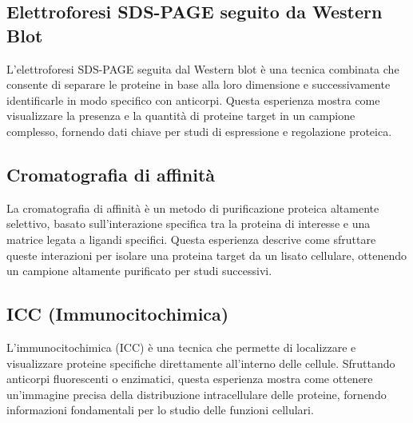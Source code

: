 \subsection{Elettroforesi SDS-PAGE seguito da Western Blot}
L’elettroforesi SDS-PAGE seguita dal Western blot è una tecnica combinata che consente di separare le proteine in base alla loro dimensione e successivamente identificarle in modo specifico con anticorpi. Questa esperienza mostra come visualizzare la presenza e la quantità di proteine target in un campione complesso, fornendo dati chiave per studi di espressione e regolazione proteica.

\subsection{Cromatografia di affinità}
La cromatografia di affinità è un metodo di purificazione proteica altamente selettivo, basato sull’interazione specifica tra la proteina di interesse e una matrice legata a ligandi specifici. Questa esperienza descrive come sfruttare queste interazioni per isolare una proteina target da un lisato cellulare, ottenendo un campione altamente purificato per studi successivi.

\subsection{ICC (Immunocitochimica)}
L’immunocitochimica (ICC) è una tecnica che permette di localizzare e visualizzare proteine specifiche direttamente all’interno delle cellule. Sfruttando anticorpi fluorescenti o enzimatici, questa esperienza mostra come ottenere un’immagine precisa della distribuzione intracellulare delle proteine, fornendo informazioni fondamentali per lo studio delle funzioni cellulari.
